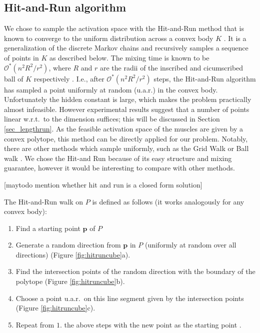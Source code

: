 \subsection{Hit-and-Run algorithm}
We chose to sample the activation space with the Hit-and-Run method that is known to converge to the uniform distribution across a convex body $K$ \cite{smith1984efficient}. It is a generalization of the discrete Markov chains and recursively samples a sequence of points in $K$ as described below. The mixing time is known to be $\mathcal{O}^*(n^2R^2/r^2)$, where $R$ and $r$ are the radii of the inscribed and cicumscribed ball of $K$ respectively \cite{Dyer, Lovasz}. I.e., after $\mathcal{O}^*(n^2R^2/r^2)$ steps, the Hit-and-Run algorithm has sampled a point uniformly at random (u.a.r.) in the convex body. Unfortunately the hidden constant is large, which makes the problem practically almost infeasible. However experimental results suggest that a number of points linear w.r.t.\ to the dimension suffices; this will be discussed in Section \ref{sec_lengthrun}.
As the feasible activation space of the muscles are given by a convex polytope, this method can be directly applied for our problem. Notably, there are other methods which sample uniformly, such as the Grid Walk or Ball walk \cite{Vempala}. We chose the Hit-and Run because of its easy structure and mixing guarantee, however it would be interesting to compare with other methods.  %

[maytodo mention whether hit and run is a closed form solution]

The Hit-and-Run walk on $P$ is defined as follows (it works analogously for any convex body):
\begin{enumerate}
\item Find a starting point $\textbf{p}$ of $P$ %
\item Generate a random direction from $\textbf{p}$ in $P$ (uniformly at random over all directions) (Figure \ref{fig:hitruncube}a).
\item Find the intersection points of the random direction with the boundary of the polytope (Figure \ref{fig:hitruncube}b).
\item Choose a point u.a.r.\ on this line segment given by the intersection points (Figure \ref{fig:hitruncube}c). 
\item Repeat from $1.$ the above steps with the new point as the starting point .
\end{enumerate}

